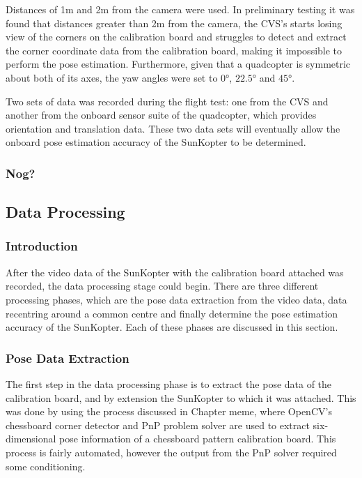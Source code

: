 Distances of 1m and 2m from the camera were used. In preliminary testing it was found that distances greater than 2m from the camera, the CVS's starts losing view of the corners on the calibration board and struggles to detect and extract the corner coordinate data from the calibration board, making it impossible to perform the pose estimation. Furthermore, given that a quadcopter is symmetric about both of its axes, the yaw angles were set to $\ang{0}$, $\ang{22.5}$ and $\ang{45}$. 

Two sets of data was recorded during the flight test: one from the CVS and another from the onboard sensor suite of the quadcopter, which provides orientation and translation data. These two data sets will eventually allow the onboard pose estimation accuracy of the SunKopter to be determined. 

\subsubsection{Nog?}

\subsection{Data Processing}

\subsubsection{Introduction}

After the video data of the SunKopter with the calibration board attached was recorded, the data processing stage could begin. There are three different processing phases, which are the pose data extraction from the video data, data recentring around a common centre and finally determine the pose estimation accuracy of the SunKopter. Each of these phases are discussed in this section. 

\subsubsection{Pose Data Extraction}

The first step in the data processing phase is to extract the pose data of the calibration board, and by extension the SunKopter to which it was attached. This was done by using the process discussed in Chapter meme, where OpenCV's chessboard corner detector and PnP problem solver are used to extract six-dimensional pose information of a chessboard pattern calibration board. This process is fairly automated, however the output from the PnP solver required some conditioning.

